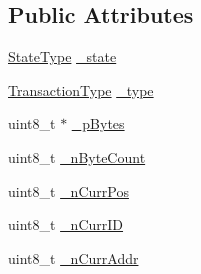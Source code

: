 \subsection*{Public Attributes}
\begin{DoxyCompactItemize}
\item 
\hyperlink{class_i2_c_transaction_ac9b45f04b6b09e815d88b0a516a4446f}{StateType} \hyperlink{class_i2_c_transaction_a5daa64c9e4deb1ff734be7666c31bc46}{\_\-state}
\item 
\hyperlink{class_i2_c_transaction_a743bc8172b552e938eaee7c8ce3fe954}{TransactionType} \hyperlink{class_i2_c_transaction_ad74d7751b9a37ffdf302da62a9ed804e}{\_\-type}
\item 
uint8\_\-t $\ast$ \hyperlink{class_i2_c_transaction_a3c04420a4def944e055fd66b262a51c7}{\_\-pBytes}
\item 
uint8\_\-t \hyperlink{class_i2_c_transaction_a24d497d1c5fd010ece230d977a0dd003}{\_\-nByteCount}
\item 
uint8\_\-t \hyperlink{class_i2_c_transaction_a952231ca793a8c72e879e44fd3fff4bc}{\_\-nCurrPos}
\item 
uint8\_\-t \hyperlink{class_i2_c_transaction_a64c7dc84f6e108ef1c2106a4c729c5fd}{\_\-nCurrID}
\item 
uint8\_\-t \hyperlink{class_i2_c_transaction_aa0ab915c4be9e95b5e2322c881512de6}{\_\-nCurrAddr}
\end{DoxyCompactItemize}


